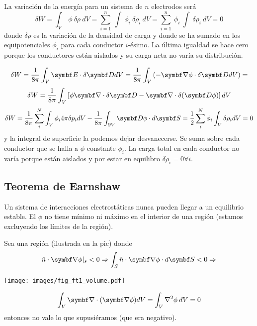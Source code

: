 \documentclass[10pt,oneside]{CBFT_book}
\begin{document}
La variación de la energía para un sistema de $ n $ electrodos será
\[
	\delta W = \int_V \: \phi \: \delta\rho \: dV  =
	\sum_{i=1}^n \: \int \: \phi_i \: \delta\rho_i \: dV =
	\sum_{i=1}^n \: \phi_i \: \int \:  \delta\rho_i \: dV = 0
\]
donde $\delta\rho$ es la variación de la densidad de carga y donde se ha sumado en los 
equipotenciales $\phi_i$ para cada conductor $i$-ésimo. La última igualdad se hace 
cero porque los conductores están aislados y su carga neta no varía su distribución.

\[
	\delta W = \frac{1}{8\pi} \int_V \vb{E}\cdot\delta\vb{D} dV = \frac{1}{8\pi} \int_V \left( 
-\Nabla\phi\cdot\delta\vb{D}  dV \right)  = 
\]
\[
	\delta W = \frac{1}{8\pi} \int_V \left[ \phi \Nabla\cdot\delta\vb{D} - 
			\Nabla\cdot\delta(\vb{D}\phi) \right] dV
\]
\[
	\delta W = \frac{1}{8\pi} \sum_i^N \int_V \phi_i 4\pi \delta p_i dV - 
		\frac{1}{8\pi} \int_{\partial V} \vb{D}\phi \cdot d\vb{S} =
		\frac{1}{2} \sum_i^N  \phi_i \int_V \delta \rho_i dV = 0
\]
y la integral de superficie la podemos dejar desvanecerse. Se suma sobre cada conductor 
que se halla a $\phi$ constante $\phi_i$.
La carga total en cada conductor no varía porque están aislados y por estar en 
equilibro $\delta \rho_i = 0 \forall i$.

\subsection{Teorema de Earnshaw}

Un sistema de interacciones electrostáticas nunca pueden llegar a un equilibrio estable.
El $\phi$ no tiene mínimo ni máximo en el interior de una región (estamos excluyendo los
límites de la región).

Sea una región (ilustrada en la pic) donde 
\[
	\hat{n}\cdot\Nabla\phi |_s < 0 \Rightarrow \int_S \hat{n}\cdot\Nabla\phi\cdot d\vb{S} < 0 \Rightarrow
\]

\texttt{[image: images/fig\_ft1\_volume.pdf]}	

\[
	\int_V \Nabla\cdot(\Nabla\phi) dV = \int_V \nabla^2 \phi \: dV = 0
\]
entonces no vale lo que supusiéramos (que era negativo).

\end{document}
